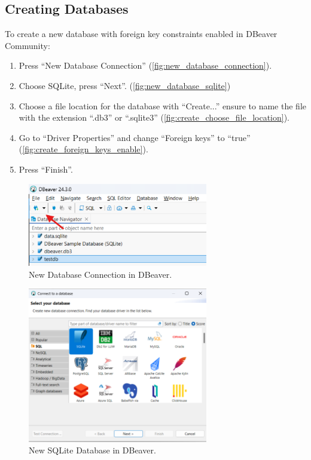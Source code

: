 \documentclass[a4paper,11pt,oneside]{article}
\begin{document}
\begin{sloppypar}

\subsection{Creating Databases}
\label{dbeaverCreatingDatabase}
To create a new database with foreign key constraints enabled in DBeaver Community:
\begin{enumerate}
    \item Press ``New Database Connection'' (\autoref{fig:new_database_connection}).
    \item Choose SQLite, press ``Next''. (\autoref{fig:new_database_sqlite})
    \item Choose a file location for the database with ``Create...'' ensure to name the file with the extension ``.db3'' or ``.sqlite3'' (\autoref{fig:create_choose_file_location}).
    \item Go to ``Driver Properties'' and change ``Foreign keys'' to ``true'' (\autoref{fig:create_foreign_keys_enable}).
    \item Press ``Finish''.
\end{enumerate}

\begin{figure}[!htb]
  \centering
  \includegraphics[width=0.7\textwidth]{dbeaver/new_database_connection.png}
  \caption{New Database Connection in DBeaver.}
  \label{fig:new_database_connection}
\end{figure}

\begin{figure}[!htb]
  \centering
  \includegraphics[width=0.7\textwidth]{dbeaver/new_database_sqlite.png}
  \caption{New SQLite Database in DBeaver.}
  \label{fig:new_database_sqlite}
\end{figure}


\end{sloppypar}
\end{document}
